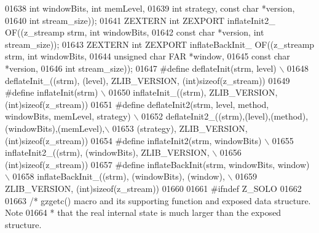 \begin{DoxyCode}
01638                                       \textcolor{keywordtype}{int} windowBits, \textcolor{keywordtype}{int} memLevel,
01639                                       \textcolor{keywordtype}{int} strategy, \textcolor{keyword}{const} \textcolor{keywordtype}{char} *version,
01640                                       \textcolor{keywordtype}{int} stream\_size));
01641 ZEXTERN \textcolor{keywordtype}{int} ZEXPORT inflateInit2\_ OF((z\_streamp strm, \textcolor{keywordtype}{int}  windowBits,
01642                                       \textcolor{keyword}{const} \textcolor{keywordtype}{char} *version, \textcolor{keywordtype}{int} stream\_size));
01643 ZEXTERN \textcolor{keywordtype}{int} ZEXPORT inflateBackInit\_ OF((z\_streamp strm, \textcolor{keywordtype}{int} windowBits,
01644                                          \textcolor{keywordtype}{unsigned} \textcolor{keywordtype}{char} FAR *window,
01645                                          \textcolor{keyword}{const} \textcolor{keywordtype}{char} *version,
01646                                          \textcolor{keywordtype}{int} stream\_size));
01647 \textcolor{preprocessor}{#define deflateInit(strm, level) \(\backslash\)}
01648 \textcolor{preprocessor}{        deflateInit\_((strm), (level), ZLIB\_VERSION, (int)sizeof(z\_stream))}
01649 \textcolor{preprocessor}{#define inflateInit(strm) \(\backslash\)}
01650 \textcolor{preprocessor}{        inflateInit\_((strm), ZLIB\_VERSION, (int)sizeof(z\_stream))}
01651 \textcolor{preprocessor}{#define deflateInit2(strm, level, method, windowBits, memLevel, strategy) \(\backslash\)}
01652 \textcolor{preprocessor}{        deflateInit2\_((strm),(level),(method),(windowBits),(memLevel),\(\backslash\)}
01653 \textcolor{preprocessor}{                      (strategy), ZLIB\_VERSION, (int)sizeof(z\_stream))}
01654 \textcolor{preprocessor}{#define inflateInit2(strm, windowBits) \(\backslash\)}
01655 \textcolor{preprocessor}{        inflateInit2\_((strm), (windowBits), ZLIB\_VERSION, \(\backslash\)}
01656 \textcolor{preprocessor}{                      (int)sizeof(z\_stream))}
01657 \textcolor{preprocessor}{#define inflateBackInit(strm, windowBits, window) \(\backslash\)}
01658 \textcolor{preprocessor}{        inflateBackInit\_((strm), (windowBits), (window), \(\backslash\)}
01659 \textcolor{preprocessor}{                      ZLIB\_VERSION, (int)sizeof(z\_stream))}
01660 
01661 \textcolor{preprocessor}{#ifndef Z\_SOLO}
01662 
01663 \textcolor{comment}{/* gzgetc() macro and its supporting function and exposed data structure.  Note}
01664 \textcolor{comment}{ * that the real internal state is much larger than the exposed structure.}

\end{DoxyCode}
